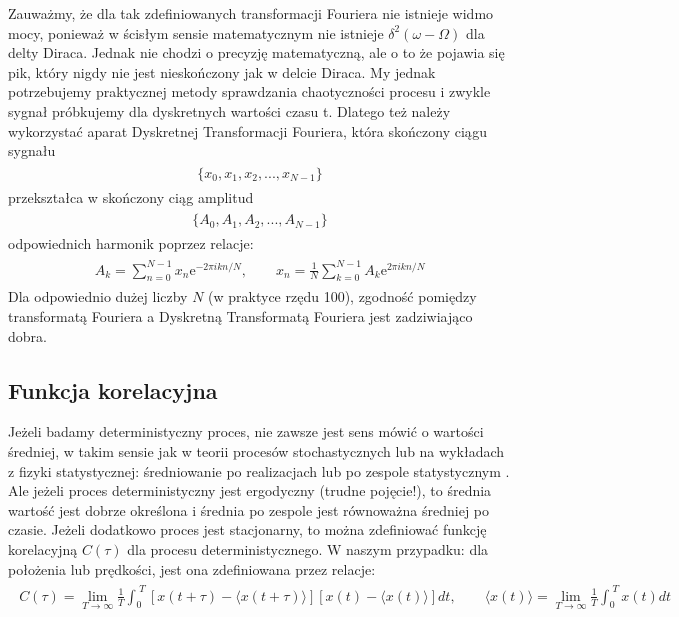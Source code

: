 \documentclass[a4paper,12pt,polish]{sphinxmanual}
\begin{document}
Zauważmy, że dla tak zdefiniowanych  transformacji Fouriera nie istnieje widmo mocy, ponieważ w ścisłym sensie matematycznym nie istnieje $\delta^2(\omega -\Omega)$ dla delty Diraca. Jednak nie chodzi o precyzję matematyczną, ale o to że pojawia się pik, który nigdy nie jest nieskończony jak w delcie Diraca. My jednak potrzebujemy praktycznej metody sprawdzania chaotyczności procesu i zwykle sygnał próbkujemy dla dyskretnych wartości czasu t. Dlatego też należy wykorzystać aparat Dyskretnej Transformacji Fouriera, która  skończony ciągu sygnału
\label{ch2/chII012:equation-eqn25}\begin{gather}
\begin{split}\{x_0, x_1, x_2, ..., x_{N-1}\}\end{split}\label{ch2/chII012-eqn25}
\end{gather}
przekształca w skończony ciąg amplitud
\label{ch2/chII012:equation-eqn26}\begin{gather}
\begin{split}\{A_0, A_1, A_2, ..., A_{N-1}\}\end{split}\label{ch2/chII012-eqn26}
\end{gather}
odpowiednich harmonik poprzez relacje:
\label{ch2/chII012:equation-eqn27}\begin{gather}
\begin{split}A_k = \sum_{n=0}^{N-1}  x_n  \mbox{e}^{- 2\pi i k n/N}, \qquad x_n = \frac{1}{N}  \sum_{k=0}^{N-1}  A_k  \mbox{e}^{2\pi i k n/N}\end{split}\label{ch2/chII012-eqn27}
\end{gather}
Dla odpowiednio dużej liczby $N$ (w praktyce rzędu 100), zgodność pomiędzy transformatą Fouriera a Dyskretną Transformatą Fouriera jest zadziwiająco dobra.


\subsection{Funkcja korelacyjna}
\label{ch2/chII012:funkcja-korelacyjna}
Jeżeli badamy deterministyczny proces, nie zawsze jest sens mówić o wartości średniej,  w takim sensie jak w teorii procesów stochastycznych lub na wykładach z fizyki statystycznej: średniowanie po realizacjach lub po zespole statystycznym . Ale jeżeli proces deterministyczny jest ergodyczny (trudne pojęcie!), to średnia wartość jest dobrze określona i średnia po zespole  jest równoważna średniej po czasie.  Jeżeli dodatkowo  proces jest stacjonarny, to można zdefiniować funkcję korelacyjną $C(\tau)$  dla procesu deterministycznego. W naszym przypadku: dla położenia lub prędkości, jest ona zdefiniowana przez relacje:
\label{ch2/chII012:equation-eqn28}\begin{gather}
\begin{split}C(\tau) = \lim_{T\to \infty}   \frac{1}{T}   \int_0^{\; T}  [x(t+\tau) - \langle x(t+\tau)\rangle]  [ x(t) - \langle x(t)\rangle]  dt, \qquad \langle x(t)\rangle = \lim_{T\to \infty}   \frac{1}{T}   \int_0^{\; T}   x(t)  dt\end{split}\label{ch2/chII012-eqn28}
\end{gather}
\end{document}
